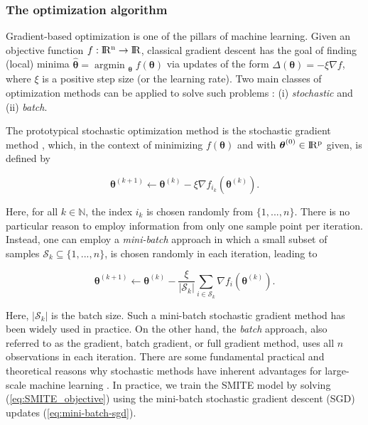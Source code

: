 \documentclass{article}
\def \real{\rm I\!R}
\DeclareMathOperator*{\argmin}{argmin~} %
\begin{document}
\subsubsection{The optimization algorithm}
\label{sec:smite_to_sgd}

Gradient-based optimization is one of the pillars of machine learning. Given an objective function $f: \real^n \rightarrow \real$, classical gradient descent has the goal of finding
(local) minima $\hat{\boldsymbol{\theta}} = \argmin_{\boldsymbol{\theta}} f(\boldsymbol{\theta})$ via updates of the form $ \Delta (\boldsymbol{\theta}) =  -\xi \nabla f$, where $\xi$
is a positive step size (or the learning rate). Two main classes of optimization methods can be applied to solve such problems : (i) {\it stochastic} and (ii) {\it batch}.

The prototypical stochastic optimization method is the stochastic gradient
method \citep{robbins1951stochastic}, which, in the context of minimizing $f(\boldsymbol{\theta})$ and with $\boldsymbol{\theta}^{(0)} \in \real^p$ given, is defined by

\begin{equation}
    \boldsymbol{\theta}^{(k+1)} \leftarrow \boldsymbol{\theta}^{(k)} - \xi \nabla f_{i_k} (\boldsymbol{\theta}^{(k)}).
\end{equation}

Here, for all $k \in \mathbb{N}$, the index $i_k$ is chosen randomly from $\{1,...,n\}$. There is no particular reason to employ information from only one sample point per iteration. Instead, one can employ a {\it mini-batch} approach in which a small subset of samples $\mathcal{S}_k \subseteq \{1, ..., n\}$, is chosen randomly in each iteration, leading to

\begin{equation}
    \boldsymbol{\theta}^{(k+1)} \leftarrow \boldsymbol{\theta}^{(k)} - \frac{\xi}{|\mathcal{S}_k|} \sum_{i \in \mathcal{S}_k} \nabla f_{i} (\boldsymbol{\theta}^{(k)}).
    \label{eq:mini-batch-sgd}
\end{equation}

Here, $|\mathcal{S}_k|$ is the batch size. Such a mini-batch stochastic gradient method has been widely used in practice. On the other hand, the {\it batch} approach, also referred to as the gradient, batch gradient, or full gradient method, uses all $n$ observations in each iteration. There are some fundamental practical and theoretical reasons why stochastic methods have inherent advantages for large-scale machine learning \citep{bottou2018optimization}. In practice, we train the SMITE model by solving (\ref{eq:SMITE_objective}) using the mini-batch stochastic gradient descent (SGD) updates (\ref{eq:mini-batch-sgd}). 
\end{document}
